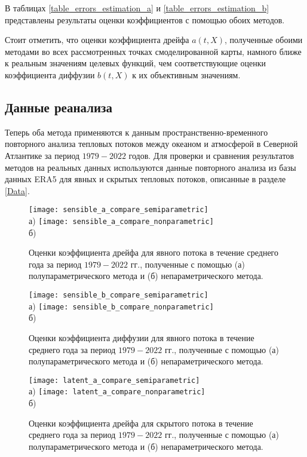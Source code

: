 В таблицах \ref{table_errors_estimation_a} и \ref{table_errors_estimation_b} представлены результаты оценки коэффициентов с помощью обоих методов.

Стоит отметить, что оценки коэффициента дрейфа $a(t,X)$, полученные обоими методами во всех рассмотренных точках смоделированной карты, намного ближе к реальным значениям целевых функций, чем соответствующие оценки коэффициента диффузии $b(t,X)$ к их объективным значениям.

\subsection{Данные реанализа}
Теперь оба метода применяются к данным пространственно-временного повторного анализа тепловых потоков между океаном и атмосферой в Северной Атлантике за период $1979-2022$ годов. Для проверки и сравнения результатов методов на реальных данных используются данные повторного анализа из базы данных ERA5 для явных и скрытых тепловых потоков, описанные в разделе \ref{Data}.

\begin{figure}[!h]
	\centering
	\texttt{[image: sensible\_a\_compare\_semiparametric]}\\
	а)
	\texttt{[image: sensible\_a\_compare\_nonparametric]}\\
	б)
	\caption{Оценки коэффициента дрейфа для явного потока в течение среднего года за период $1979-2022$ гг., полученные с помощью (а) полупараметрического метода и (б) непараметрического метода.} 
	\label{fig_sensible_compare_a}
\end{figure}


\begin{figure}[!h]
	\centering
	\texttt{[image: sensible\_b\_compare\_semiparametric]}\\
	а)
	\texttt{[image: sensible\_b\_compare\_nonparametric]}\\
	б)
	\caption{Оценки коэффициента диффузии для явного потока в течение среднего года за период $1979-2022$ гг., полученные с помощью (а) полупараметрического метода и (б) непараметрического метода.} 
	\label{fig_sensible_compare_b}
\end{figure}

\begin{figure}[!h]
	\centering
	\texttt{[image: latent\_a\_compare\_semiparametric]}\\
	а)
	\texttt{[image: latent\_a\_compare\_nonparametric]}\\
	б)
	\caption{Оценки коэффициента дрейфа для скрытого потока в течение среднего года за период $1979-2022$ гг., полученные с помощью (а) полупараметрического метода и (б) непараметрического метода.} 
	\label{fig_latent_compare_a}
\end{figure}


